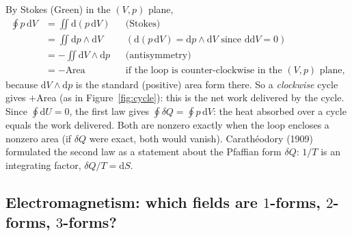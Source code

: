\documentclass[11pt,a4paper]{article}
\numberwithin{equation}{section}
\theoremstyle{definition}
\theoremstyle{plain}
\newcommand{\dd}{\mathrm{d}}
\begin{document}
By Stokes (Green) in the $(V,p)$ plane,
\begin{align*}
\oint p\,\dd V&=\iint\dd(p\,\dd V) &&\text{(Stokes)}\\
&=\iint\dd p\wedge\dd V &&(\dd(p\,\dd V)=\dd p\wedge\dd V\text{ since }\dd\dd V=0)\\
&=-\iint\dd V\wedge\dd p &&\text{(antisymmetry)}\\
&=-\text{Area} &&\text{if the loop is counter-clockwise in the $(V,p)$ plane,}
\end{align*}
because $\dd V\wedge\dd p$ is the standard (positive) area form there. So a \emph{clockwise} cycle gives $+$Area (as in Figure~\ref{fig:cycle}): this is the net work delivered by the cycle. Since $\oint\dd U=0$, the first law gives $\oint\delta Q=\oint p\,\dd V$: the heat absorbed over a cycle equals the work delivered. Both are nonzero exactly when the loop encloses a nonzero area (if $\delta Q$ were exact, both would vanish).
Carath\'eodory (1909) formulated the second law as a statement about the Pfaffian form $\delta Q$: $1/T$ is an integrating factor, $\delta Q/T=\dd S$.

\subsection{Electromagnetism: which fields are $1$-forms, $2$-forms, $3$-forms?}\label{sec:phys-em}
\end{document}
